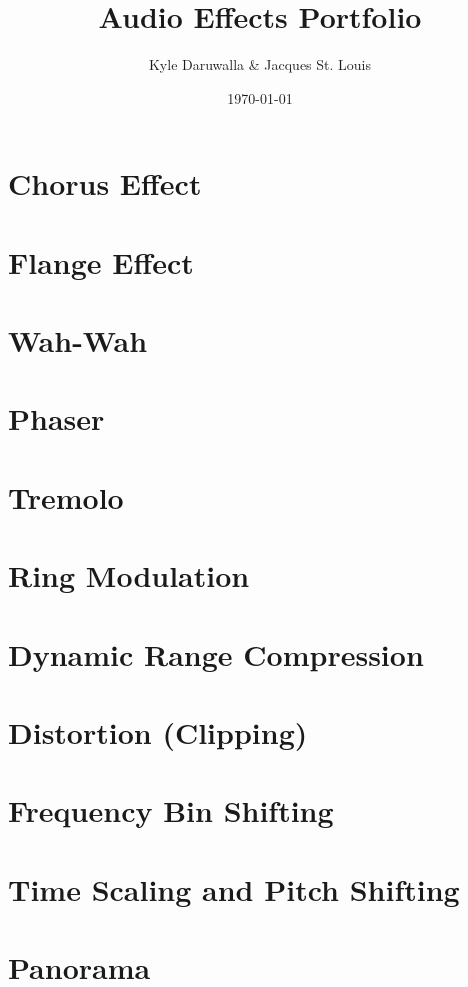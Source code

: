 \documentclass{article}
\title{Audio Effects Portfolio}
\author{Kyle Daruwalla \& Jacques St. Louis}
\date{\today}
\begin{document}
\maketitle

\section{Chorus Effect}


\newpage

\section{Flange Effect}


\newpage

\section{Wah-Wah}


\newpage

\section{Phaser}


\newpage

\section{Tremolo}


\newpage

\section{Ring Modulation}


\newpage

\section{Dynamic Range Compression}


\section{Distortion (Clipping)}


\newpage

\section{Frequency Bin Shifting}


\newpage

\section{Time Scaling and Pitch Shifting}


\newpage

\section{Panorama}


\newpage


\end{document}
